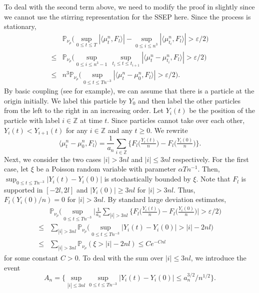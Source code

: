 \documentclass[reqno,11pt]{amsart}
\numberwithin{equation}{section}
\newcommand{\Pbb}{\mathbb{P}}
\newcommand{\Z}{\mathbb{Z}}
\begin{document}
To deal with the second term above, we need to modify the proof in \cite{xue2024sample} slightly since we cannot use the stirring representation for the SSEP here. Since the process is stationary,
\begin{align*}
	&\Pbb_{\nu_\rho} \Big( \sup_{0 \leq t \leq T} |\langle \mu^n_t,F_l\rangle | - \sup_{0 \leq i \leq n^3} |\langle \mu^n_{t_i},F_l\rangle |  >  \varepsilon/2 \Big) \\
	\leq& \Pbb_{\nu_\rho} \Big( \sup_{0 \leq i \leq n^3-1} \,\sup_{t_i \leq t \leq t_{i+1}} |\langle \mu^n_t - \mu^n_{t_i},F_l\rangle |  >  \varepsilon/2 \Big)\\
	\leq& n^3 \Pbb_{\nu_\rho} \Big( \sup_{0 \leq t \leq Tn^{-3}} |\langle \mu^n_t - \mu^n_{0},F_l\rangle |  >  \varepsilon/2 \Big).
\end{align*}
By basic coupling (see \cite{liggettips} for example), we can assume that there is a particle at the origin initially. We label this particle by $Y_0$ and then label the other particles from the left to the right in an increasing order. Let $Y_i (t)$ be the position of the particle with label $i \in \Z$ at time $t$. Since particles cannot take over each other, $Y_i (t) < Y_{i+1} (t)$ for any $i \in \Z$ and any $t \geq 0$. We rewrite
\[\langle \mu^n_t - \mu^n_{0},F_l \rangle = \frac{1}{a_n} \sum_{i \in \Z} \Big\{F_l \big(\tfrac{Y_i(t)}{n}\big) - F_l \big(\tfrac{Y_i(0)}{n}\big)\Big\}.\]
Next, we consider the two cases $|i| > 3 n l$ and $|i| \leq 3 n l$ respectively. For the first case, let $\xi$ be a Poisson random variable with parameter $\alpha T n^{-1}$. Then, $\sup_{0 \leq t \leq Tn^{-3}}|Y_i (t) - Y_i (0)|$ is stochastically bounded by $\xi$.  Note that $F_l$ is supported in $[-2l,2l]$ and $|Y_i (0)| \geq 3 n l$ for $|i| > 3 n l$. Thus, $F_l (Y_i (0) / n) = 0$ for  $|i| > 3 n l$.  By standard large deviation estimates, 
\begin{align*}
	&\Pbb_{\nu_\rho} \Big( \sup_{0 \leq t \leq Tn^{-3}} \big|\frac{1}{a_n} \sum_{|i| > 3 n l} \Big\{F_l \big(\tfrac{Y_i(t)}{n}\big) - F_l \big(\tfrac{Y_i(0)}{n}\big)  \big|  >  \varepsilon/2 \Big)\\
	\leq& \sum_{|i| > 3 n l} \Pbb_{\nu_\rho} \Big(  \sup_{0 \leq t \leq Tn^{-3}} |Y_i (t) - Y_i (0)| > |i| - 2 n l\Big)\\
	\leq& \sum_{|i| > 3 n l} \Pbb_{\nu_\rho} (\xi > |i| - 2 n l) \leq C e^{-Cnl}
\end{align*}
for some constant $C > 0$. To deal with the sum over  $|i| \leq 3 n l$, we introduce the event
\[A_n = \Big\{  \sup_{|i| \leq 3 n l} \sup_{0 \leq t \leq Tn^{-3}} |Y_i (t) - Y_i (0)| \leq a_n^{3/2}/n^{1/2}\Big\}.\]
\end{document}
